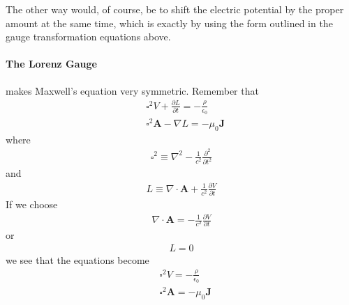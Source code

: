 The other way would, of course, be to shift the electric potential by the proper amount at the same time, which is exactly by using the form outlined in the gauge transformation equations above.

\paragraph{The Lorenz Gauge} makes Maxwell's equation very symmetric. Remember that \begin{align*}
    &\square^{2} V + \frac{\partial L}{\partial t} = -\frac{\rho}{\epsilon _0}\\
    &\square^{2} \mathbf{A} - \nabla L = -\mu _0 \mathbf{J}
\end{align*}
where \begin{align*}
    \square^{2} \equiv \nabla ^{2} - \frac{1}{c^{2} } \frac{\partial^{2} }{\partial t^{2} } 
\end{align*}
and \begin{align*}
    L \equiv \nabla \cdot \mathbf{A} + \frac{1}{c^{2} }\frac{\partial V}{\partial t} 
\end{align*} 
If we choose \begin{align*}
    \nabla \cdot \mathbf{A} = - \frac{1}{c^{2} } \frac{\partial V}{\partial t} 
\end{align*}
or \begin{align*}
    L = 0
\end{align*}
we see that the equations become  \begin{align*}
    &\square ^{2} V = -\frac{\rho}{\epsilon_0}\\
    &\square^{2} \mathbf{A} = -\mu _0 \mathbf{J}
\end{align*}

